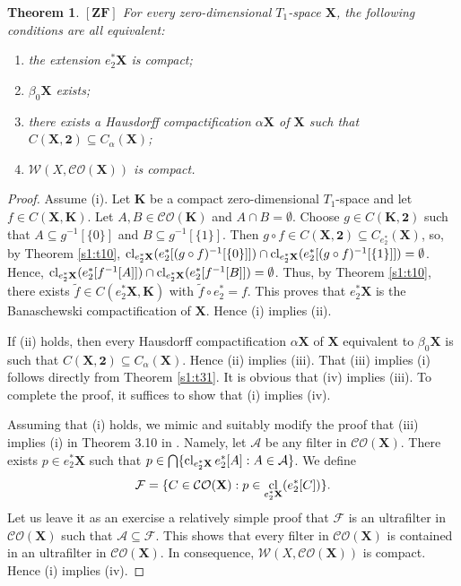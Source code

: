 \documentclass[12pt,twoside,leqno]{article}
\theoremstyle{plain}
\newtheorem{theorem}{Theorem}[section]
\theoremstyle{definition}
\theoremstyle{remark}
\DeclareMathOperator{\cl}{{\rm cl}}
\begin{document}
\begin{theorem}
	\label{s2:t1}
	$[\mathbf{ZF}]$ For every zero-dimensional $T_1$-space $\mathbf{X}$, the following conditions are all equivalent:
	\begin{enumerate}
		\item[(i)] the extension $e^{\ast}_{2}\mathbf{X}$ is compact;
		\item[(ii)] $\beta_0\mathbf{X}$ exists;
		\item[(iii)] there exists a Hausdorff compactification $\alpha\mathbf{X}$ of $\mathbf{X}$ such that $C(\mathbf{X}, \mathbf{2})\subseteq C_{\alpha}(\mathbf{X})$; 
		\item[(iv)] $\mathcal{W}(X, \mathcal{CO}(\mathbf{X}))$ is compact.
	\end{enumerate}
\end{theorem}
\begin{proof}
	Assume (i). Let $\mathbf{K}$ be a compact zero-dimensional $T_1$-space and let $f\in C(\mathbf{X}, \mathbf{K})$. Let $A,B\in \mathcal{CO}(\mathbf{K})$ and $A\cap B=\emptyset$. Choose $g\in C(\mathbf{K},\mathbf{2})$ such that $A\subseteq g^{-1}[\{0\}]$ and $B\subseteq g^{-1}[\{1\}]$. Then $g\circ f\in C(\mathbf{X}, \mathbf{2})\subseteq C_{e^{\ast}_{2}}(\mathbf{X})$, so, by Theorem \ref{s1:t10}, $\cl_{e^{\ast}_{2}\mathbf{X}}(e^{\ast}_{2}[(g\circ f)^{-1}[\{0\}]])\cap \cl_{e^{\ast}_{2}\mathbf{X}}(e^{\ast}_{2}[(g\circ f)^{-1}[\{1\}]])=\emptyset$. Hence,  $\cl_{e^{\ast}_{2}\mathbf{X}}(e^{\ast}_{2}[f^{-1}[A]])\cap \cl_{e^{\ast}_{2}\mathbf{X}}(e^{\ast}_{2}[f^{-1}[B]])=\emptyset$. Thus, by Theorem \ref{s1:t10}, there exists $\tilde{f}\in C(e^{\ast}_{2}\mathbf{X}, \mathbf{K})$ with $\tilde{f}\circ e^{\ast}_{2}=f$. This proves that $e^{\ast}_{2}\mathbf{X}$ is the Banaschewski compactification of $\mathbf{X}$. Hence (i) implies (ii). 
	
	If (ii) holds, then every Hausdorff compactification $\alpha\mathbf{X}$ of $\mathbf{X}$ equivalent to $\beta_0\mathbf{X}$ is such that $C(\mathbf{X}, \mathbf{2})\subseteq C_{\alpha}(\mathbf{X})$. Hence (ii) implies (iii). That (iii) implies (i) follows directly from Theorem \ref{s1:t31}. It is obvious that (iv) implies (iii). To complete the proof, it suffices to show that (i) implies (iv).
	
	Assuming that (i) holds, we mimic and suitably modify the proof that (iii) implies (i) in Theorem 3.10 in \cite{kw1}. Namely, let $\mathcal{A}$ be any filter in $\mathcal{CO}(\mathbf{X})$. There exists $p\in e^{\ast}_{2}\mathbf{X}$ such that $p\in\bigcap\{ \cl_{e^{\ast}_{2}\mathbf{X}}e^{\ast}_{2}[A]: A\in\mathcal{A}\}$. We define
	$$\mathcal{F}=\{ C\in\mathcal{CO}(\mathbf{X}): p\in\cl_{e^{\ast}_{2}\mathbf{X}}(e^{\ast}_{2}[C])\}.$$ 
	Let us leave it as an exercise a relatively simple proof that $\mathcal{F}$ is an ultrafilter in $\mathcal{CO}(\mathbf{X})$ such that $\mathcal{A}\subseteq\mathcal{F}$. This shows that every filter in $\mathcal{CO}(\mathbf{X})$ is contained in an ultrafilter in $\mathcal{CO}(\mathbf{X})$. In consequence,  $\mathcal{W}(X, \mathcal{CO}(\mathbf{X}))$ is compact. Hence (i) implies (iv).
\end{proof}
\end{document}
